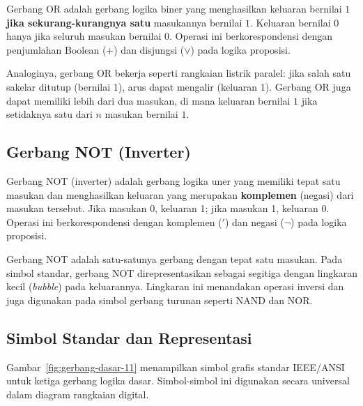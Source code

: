 \begin{definisi}[Gerbang OR]
Gerbang OR adalah gerbang logika biner yang menghasilkan keluaran bernilai $1$ \textbf{jika sekurang-kurangnya satu} masukannya bernilai $1$. Keluaran bernilai $0$ hanya jika seluruh masukan bernilai $0$. Operasi ini berkorespondensi dengan penjumlahan Boolean ($+$) dan disjungsi ($\vee$) pada logika proposisi.
\end{definisi}

Analoginya, gerbang OR bekerja seperti rangkaian listrik paralel: jika salah satu sakelar ditutup (bernilai 1), arus dapat mengalir (keluaran 1). Gerbang OR juga dapat memiliki lebih dari dua masukan, di mana keluaran bernilai $1$ jika setidaknya satu dari $n$ masukan bernilai $1$.

\subsection{Gerbang NOT (Inverter)}

\begin{definisi}
Gerbang NOT (inverter) adalah gerbang logika uner yang memiliki tepat satu masukan dan menghasilkan keluaran yang merupakan \textbf{komplemen} (negasi) dari masukan tersebut. Jika masukan 0, keluaran 1; jika masukan 1, keluaran 0. Operasi ini berkorespondensi dengan komplemen ($'$) dan negasi ($\neg$) pada logika proposisi.
\end{definisi}

Gerbang NOT adalah satu-satunya gerbang dengan tepat satu masukan. Pada simbol standar, gerbang NOT direpresentasikan sebagai segitiga dengan lingkaran kecil (\textit{bubble}) pada keluarannya. Lingkaran ini menandakan operasi inversi dan juga digunakan pada simbol gerbang turunan seperti NAND dan NOR.

\subsection{Simbol Standar dan Representasi}

Gambar~\ref{fig:gerbang-dasar-11} menampilkan simbol grafis standar IEEE/ANSI untuk ketiga gerbang logika dasar. Simbol-simbol ini digunakan secara universal dalam diagram rangkaian digital.

